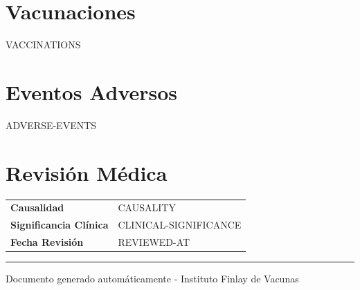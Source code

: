 \documentclass[10pt,a4paper]{article}
\newcommand{\field}[1]{\textbf{\small #1}}
\begin{document}
\section*{Vacunaciones}

{{VACCINATIONS}}

\section*{Eventos Adversos}

{{ADVERSE-EVENTS}}

\section*{Revisión Médica}

\begin{tabularx}{\textwidth}{X X}
\field{Causalidad} & {{CAUSALITY}} \\
\field{Significancia Clínica} & {{CLINICAL-SIGNIFICANCE}} \\
\field{Fecha Revisión} & {{REVIEWED-AT}} \\
\end{tabularx}

\vfill

\hrule
\small Documento generado automáticamente - Instituto Finlay de Vacunas
\end{document}
